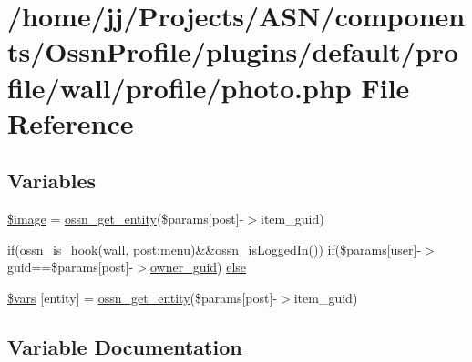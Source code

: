 \hypertarget{profile_2photo_8php}{}\section{/home/jj/\+Projects/\+A\+S\+N/components/\+Ossn\+Profile/plugins/default/profile/wall/profile/photo.php File Reference}
\label{profile_2photo_8php}
\subsection*{Variables}
\begin{DoxyCompactItemize}
\item 
\hyperlink{profile_2photo_8php_aac6146b4cdec66c94263ddb55afd5946}{\$image} = \hyperlink{ossn_8lib_8entities_8php_a6167f40e5a04dc1984990eef4fc7c112}{ossn\+\_\+get\+\_\+entity}(\$params\mbox{[}\textquotesingle{}post\textquotesingle{}\mbox{]}-\/$>$item\+\_\+guid)
\item 
\hyperlink{jquery_8tokeninput_8js_ad8dd46a3cbc004569e34401e9e71771a}{if}(\hyperlink{ossn_8lib_8system_8php_ae29c30c131d7600928d7a2fc28bcd322}{ossn\+\_\+is\+\_\+hook}(\textquotesingle{}wall\textquotesingle{}, \textquotesingle{}post\+:menu\textquotesingle{})\&\&ossn\+\_\+is\+Logged\+In()) \hyperlink{jquery_8tokeninput_8js_ad8dd46a3cbc004569e34401e9e71771a}{if}(\$params\mbox{[}\textquotesingle{}\hyperlink{ossn_8config_8db_8example_8php_a802544b7ba9f79bbf24ef67773d53bed}{user}\textquotesingle{}\mbox{]}-\/$>$guid==\$params\mbox{[}\textquotesingle{}post\textquotesingle{}\mbox{]}-\/$>$\hyperlink{user_8php_a307051fefc937afd02c509c55646f50b}{owner\+\_\+guid}) \hyperlink{profile_2photo_8php_a455b1f9c77db61838a93b44445ad7413}{else}
\item 
\hyperlink{profile_2photo_8php_aa07d093940e8b3330058e9f2c4396426}{\$vars} \mbox{[}\textquotesingle{}entity\textquotesingle{}\mbox{]} = \hyperlink{ossn_8lib_8entities_8php_a6167f40e5a04dc1984990eef4fc7c112}{ossn\+\_\+get\+\_\+entity}(\$params\mbox{[}\textquotesingle{}post\textquotesingle{}\mbox{]}-\/$>$item\+\_\+guid)
\end{DoxyCompactItemize}


\subsection{Variable Documentation}
